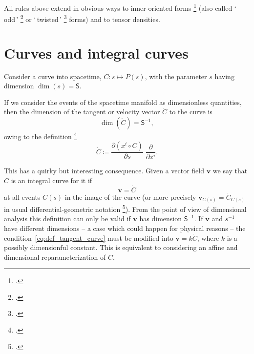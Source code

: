 \documentclass[\ifafour a4paper,12pt,\else a5paper,10pt,\fi%
onecolumn,oneside,article,%
british%
]{memoir}
\newcommand*{\defquote}[1]{`\,#1\,'}
\theoremstyle{remark}
\theoremstyle{innote}
\newcommand*{\citep}{\footcites}
\newcommand*{\de}{\partialup}%
\newcommand*{\defd}{\coloneqq}
\renewcommand*{\|}[1][]{\nonscript\,#1\vert\nonscript\;\mathopen{}}
\newcommand*{\sect}{\S}%
\newcommand*{\chap}{ch.}%
\newcommand*{\Ss}{\textsf{S}}
\newcommand*{\yv}{\bm{v}}
\newcommand*{\dex}[1][i]{\frac{\de}{\de x^{#1}}}
\begin{document}
All rules above extend in obvious ways to inner-oriented forms
\citep[\chap~II]{schouten1951_r1989} (also called \defquote{odd}
\citep[\chap~II]{derham1955_t1984} or \defquote{twisted}
\citep{burke1983}[\chap~3]{bossavit1991} forms) and to tensor densities.


\section{Curves and integral curves}
\label{sec:curves}


Consider a curve into spacetime, $C\colon s \mapsto P(s)$, with the
parameter $s$ having dimension $\dim(s)=\Ss$.


If we consider the events of the spacetime manifold as dimensionless
quantities, then the dimension of the tangent or velocity vector $\dot{C}$
to the curve is
\begin{equation}
  \label{eq:dim_velocity}
  \dim(\dot{C}) = \Ss^{-1},
\end{equation}
owing to the definition
\citep[\sect~III.B.1]{choquetbruhatetal1977_r1996}[\sect~IV.(1.9)]{boothby1975_r2003}
\begin{equation}
  \label{eq:def_tangent_curve}
\dot{C} \defd \frac{\de (x^{i} \circ C)}{\de s}\;\dex .
\end{equation}

This has a quirky but interesting consequence. Given a vector field $\yv$
we say that $C$ is an integral curve for it if
\begin{equation}
  \yv = \dot{C}
  \label{eq:integral_curve}
\end{equation}
at all events $C(s)$ in the image of the curve (or more precisely
$\yv_{C(s)} = \dot{C}_{C(s)}$ in usual differential-geometric notation
\citep[\sect~III.B.1]{choquetbruhatetal1977_r1996}). From the point of view
of dimensional analysis this definition can only be valid if $\yv$ has
dimension $\Ss^{-1}$. If $\yv$ and $s^{-1}$ have different dimensions -- a
case which could happen for physical reasons -- the
condition~\eqref{eq:def_tangent_curve} must be modified into
$\yv = k\dot{C}$, where $k$ is a possibly dimensionful constant. This is
equivalent to considering an affine and dimensional reparameterization of
$C$.

\end{document}
